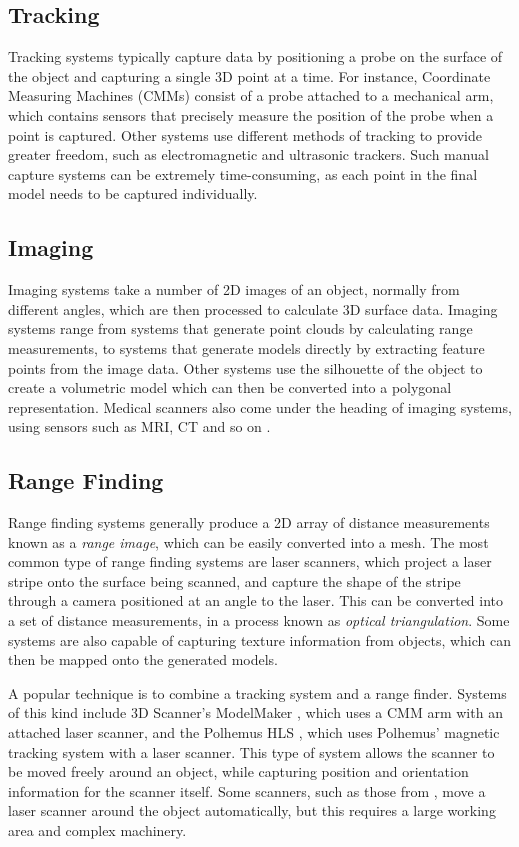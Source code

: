 \subsection{\label{sec:litreview:scanning:tracking}Tracking}
Tracking systems typically capture data by positioning a probe on the surface of the object and capturing a single 3D point at a time. For instance, Coordinate Measuring Machines (CMMs) consist of a probe attached to a mechanical arm, which contains sensors that precisely measure the position of the probe when a point is captured. Other systems use different methods of tracking to provide greater freedom, such as electromagnetic and ultrasonic trackers. Such manual capture systems can be extremely time-consuming, as each point in the final model needs to be captured individually.

\subsection{\label{sec:litreview:scanning:imaging}Imaging}
Imaging systems take a number of 2D images of an object, normally from different angles, which are then processed to calculate 3D surface data. Imaging systems range from systems that generate point clouds by calculating range measurements, to systems that generate models directly by extracting feature points from the image data. Other systems use the silhouette of the object to create a volumetric model which can then be converted into a polygonal representation. Medical scanners also come under the heading of imaging systems, using sensors such as MRI, CT and so on \cite{Short02}.

\subsection{\label{sec:litreview:scanning:range}Range Finding}
Range finding systems generally produce a 2D array of distance measurements known as a {\it range image}, which can be easily converted into a mesh. The most common type of range finding systems are laser scanners, which project a laser stripe onto the surface being scanned, and capture the shape of the stripe through a camera positioned at an angle to the laser. This can be converted into a set of distance measurements, in a process known as {\it optical triangulation}. Some systems are also capable of capturing texture information from objects, which can then be mapped onto the generated models. 

A popular technique is to combine a tracking system and a range finder. Systems of this kind include 3D Scanner's ModelMaker \cite{3DScanners}, which uses a CMM arm with an attached laser scanner, and the Polhemus HLS \cite{Polhemus}, which uses Polhemus' magnetic tracking system with a laser scanner. This type of system allows the scanner to be moved freely around an object, while capturing position and orientation information for the scanner itself. Some scanners, such as those from \citet{Cyberware}, move a laser scanner around the object automatically, but this requires a large working area and complex machinery. 

